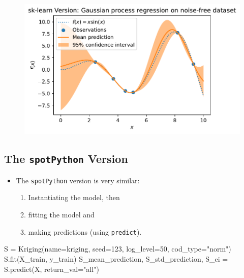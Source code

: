 \documentclass[
  letterpaper,
  DIV=11,
  numbers=noendperiod]{scrreprt}
\newenvironment{Shaded}{\begin{snugshade}}{\end{snugshade}}
\newcommand{\DecValTok}[1]{\textcolor[rgb]{0.68,0.00,0.00}{#1}}
\newcommand{\NormalTok}[1]{\textcolor[rgb]{0.00,0.23,0.31}{#1}}
\newcommand{\OperatorTok}[1]{\textcolor[rgb]{0.37,0.37,0.37}{#1}}
\newcommand{\StringTok}[1]{\textcolor[rgb]{0.13,0.47,0.30}{#1}}
\providecommand{\tightlist}{%
  \setlength{\itemsep}{0pt}\setlength{\parskip}{0pt}}\usepackage{longtable,booktabs,array}
\begin{document}
\begin{figure}[H]

{\centering \includegraphics{06_spot_gaussian_files/figure-pdf/cell-5-output-1.pdf}

}

\end{figure}

\hypertarget{the-spotpython-version}{%
\subsection{\texorpdfstring{The \texttt{spotPython}
Version}{The spotPython Version}}\label{the-spotpython-version}}

\begin{itemize}
\tightlist
\item
  The \texttt{spotPython} version is very similar:

  \begin{enumerate}
  \def\labelenumi{\arabic{enumi}.}
  \tightlist
  \item
    Instantiating the model, then
  \item
    fitting the model and
  \item
    making predictions (using \texttt{predict}).
  \end{enumerate}
\end{itemize}

\begin{Shaded}
\begin{Highlighting}[]
\NormalTok{S }\OperatorTok{=}\NormalTok{ Kriging(name}\OperatorTok{=}\StringTok{\textquotesingle{}kriging\textquotesingle{}}\NormalTok{,  seed}\OperatorTok{=}\DecValTok{123}\NormalTok{, log\_level}\OperatorTok{=}\DecValTok{50}\NormalTok{, cod\_type}\OperatorTok{=}\StringTok{"norm"}\NormalTok{)}
\NormalTok{S.fit(X\_train, y\_train)}
\NormalTok{S\_mean\_prediction, S\_std\_prediction, S\_ei }\OperatorTok{=}\NormalTok{ S.predict(X, return\_val}\OperatorTok{=}\StringTok{"all"}\NormalTok{)}
\end{Highlighting}
\end{Shaded}
\end{document}
